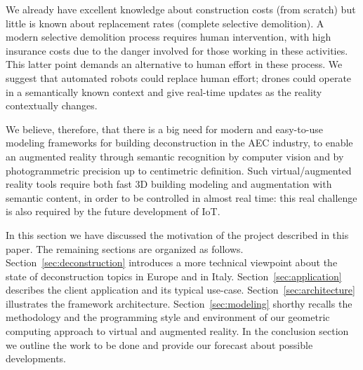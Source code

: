 We already have excellent knowledge about construction costs (from scratch) but little is known about replacement rates (complete selective demolition). A modern selective demolition process requires human intervention, with high insurance costs due to the danger involved for those working in these activities. This latter point demands an alternative to human effort in these process. We suggest that automated robots could replace human effort; drones could operate in a semantically known context and give real-time updates as the reality contextually changes. 

We believe, therefore, that there is a big need for modern and easy-to-use modeling frameworks for building deconstruction in the AEC industry, to enable an augmented reality through semantic recognition by computer vision and by photogrammetric precision up to centimetric definition. Such virtual/augmented reality tools require both fast 3D building modeling and augmentation with semantic content, in order to be controlled in almost real time: this real challenge is also required by the future development of IoT. 	       
 
In this section we have discussed the motivation of the project described in this paper. The remaining sections are organized as follows.
Section~\ref{sec:deconstruction} introduces a more technical viewpoint about the state of deconstruction topics in Europe and in Italy.
Section~\ref{sec:application} describes the client application and its typical use-case. 
Section~\ref{sec:architecture} illustrates the framework architecture. 
Section~\ref{sec:modeling} shorthy recalls the methodology and the programming style and environment of our geometric computing approach to virtual and augmented reality.
In the conclusion section we outline the work to be done and provide our forecast about possible developments.
